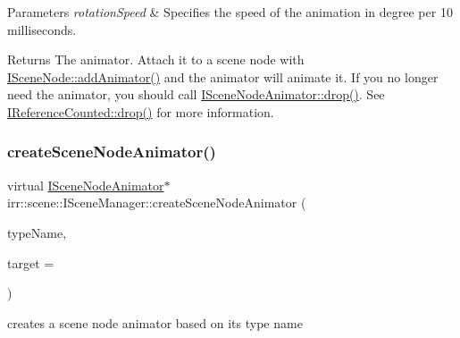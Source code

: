 \begin{DoxyParams}{Parameters}
{\em rotation\+Speed} & Specifies the speed of the animation in degree per 10 milliseconds. \\
\hline
\end{DoxyParams}
\begin{DoxyReturn}{Returns}
The animator. Attach it to a scene node with \hyperlink{classirr_1_1scene_1_1ISceneNode_a0e5cd342cd7293c136e53e2c2c5e0f3a}{I\+Scene\+Node\+::add\+Animator()} and the animator will animate it. If you no longer need the animator, you should call \hyperlink{classirr_1_1IReferenceCounted_a03856a09355b89d178090c4a5f738543}{I\+Scene\+Node\+Animator\+::drop()}. See \hyperlink{classirr_1_1IReferenceCounted_a03856a09355b89d178090c4a5f738543}{I\+Reference\+Counted\+::drop()} for more information. 
\end{DoxyReturn}
\mbox{\label{classirr_1_1scene_1_1ISceneManager_ac63c38a05b8e7d0a11ddb1752da36835}} 
\subsubsection{\texorpdfstring{create\+Scene\+Node\+Animator()}{createSceneNodeAnimator()}\hspace{0.1cm}{\footnotesize\ttfamily [1/2]}}
{\footnotesize\ttfamily virtual \hyperlink{classirr_1_1scene_1_1ISceneNodeAnimator}{I\+Scene\+Node\+Animator}$\ast$ irr\+::scene\+::\+I\+Scene\+Manager\+::create\+Scene\+Node\+Animator (\begin{DoxyParamCaption}\item[{const char $\ast$}]{type\+Name,  }\item[{\hyperlink{classirr_1_1scene_1_1ISceneNode}{I\+Scene\+Node} $\ast$}]{target = {} }\end{DoxyParamCaption})\hspace{0.3cm}{\ttfamily [pure virtual]}}



creates a scene node animator based on its type name 


